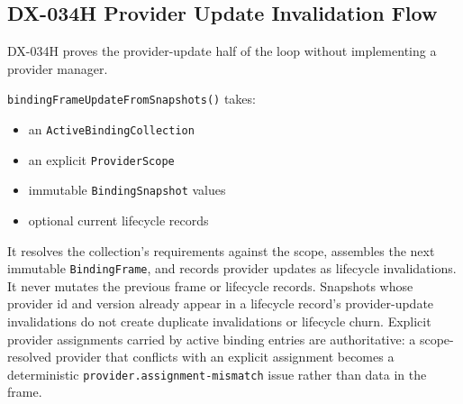 \subsection{DX-034H Provider Update Invalidation Flow}\label{record-132-dx-034h-provider-update-invalidation-flow}

DX-034H proves the provider-update half of the loop without implementing a provider manager.

\texttt{b\allowbreak{}i\allowbreak{}n\allowbreak{}d\allowbreak{}i\allowbreak{}n\allowbreak{}g\allowbreak{}F\allowbreak{}r\allowbreak{}a\allowbreak{}m\allowbreak{}e\allowbreak{}U\allowbreak{}p\allowbreak{}d\allowbreak{}a\allowbreak{}t\allowbreak{}e\allowbreak{}F\allowbreak{}r\allowbreak{}o\allowbreak{}m\allowbreak{}S\allowbreak{}n\allowbreak{}a\allowbreak{}p\allowbreak{}s\allowbreak{}h\allowbreak{}o\allowbreak{}t\allowbreak{}s\allowbreak{}(\allowbreak{})} takes:

\begin{itemize}
\tightlist
\item
  an \texttt{A\allowbreak{}c\allowbreak{}t\allowbreak{}i\allowbreak{}v\allowbreak{}e\allowbreak{}B\allowbreak{}i\allowbreak{}n\allowbreak{}d\allowbreak{}i\allowbreak{}n\allowbreak{}g\allowbreak{}C\allowbreak{}o\allowbreak{}l\allowbreak{}l\allowbreak{}e\allowbreak{}c\allowbreak{}t\allowbreak{}i\allowbreak{}o\allowbreak{}n}
\item
  an explicit \texttt{P\allowbreak{}r\allowbreak{}o\allowbreak{}v\allowbreak{}i\allowbreak{}d\allowbreak{}e\allowbreak{}r\allowbreak{}S\allowbreak{}c\allowbreak{}o\allowbreak{}p\allowbreak{}e}
\item
  immutable \texttt{B\allowbreak{}i\allowbreak{}n\allowbreak{}d\allowbreak{}i\allowbreak{}n\allowbreak{}g\allowbreak{}S\allowbreak{}n\allowbreak{}a\allowbreak{}p\allowbreak{}s\allowbreak{}h\allowbreak{}o\allowbreak{}t} values
\item
  optional current lifecycle records
\end{itemize}

It resolves the collection's requirements against the scope, assembles the next immutable \texttt{B\allowbreak{}i\allowbreak{}n\allowbreak{}d\allowbreak{}i\allowbreak{}n\allowbreak{}g\allowbreak{}F\allowbreak{}r\allowbreak{}a\allowbreak{}m\allowbreak{}e}, and records provider updates as lifecycle invalidations. It never mutates the previous frame or lifecycle records. Snapshots whose provider id and version already appear in a lifecycle record's provider-update invalidations do not create duplicate invalidations or lifecycle churn. Explicit provider assignments carried by active binding entries are authoritative: a scope-resolved provider that conflicts with an explicit assignment becomes a deterministic \texttt{p\allowbreak{}r\allowbreak{}o\allowbreak{}v\allowbreak{}i\allowbreak{}d\allowbreak{}e\allowbreak{}r\allowbreak{}.\allowbreak{}a\allowbreak{}s\allowbreak{}s\allowbreak{}i\allowbreak{}g\allowbreak{}n\allowbreak{}m\allowbreak{}e\allowbreak{}n\allowbreak{}t\allowbreak{}-\allowbreak{}m\allowbreak{}i\allowbreak{}s\allowbreak{}m\allowbreak{}a\allowbreak{}t\allowbreak{}c\allowbreak{}h} issue rather than data in the frame.


